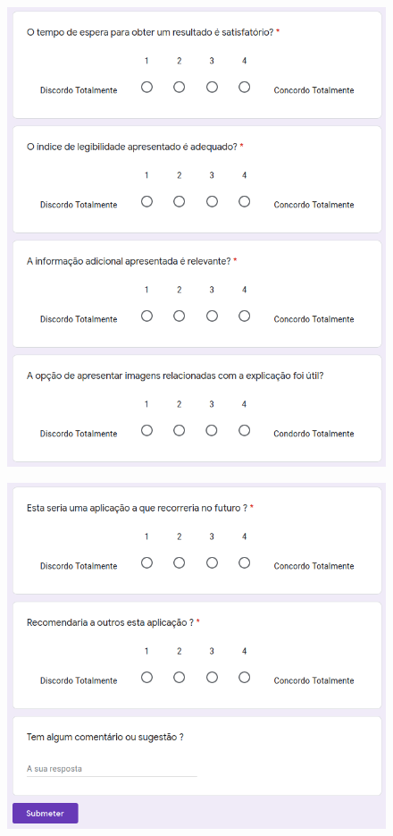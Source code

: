 \begin{figure}[H]
    \centering
    \includegraphics[scale=0.7]{appendices/assets/survey3.png}
    \label{fig:survey3}
\end{figure}

\begin{figure}[H]
    \centering
    \includegraphics[scale=0.7]{appendices/assets/survey4.png}
    \label{fig:survey4}
\end{figure}


